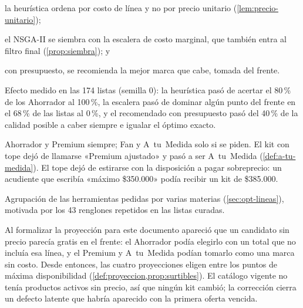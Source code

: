 \begin{evolucion}
\begin{description}[style=nextline,leftmargin=0pt]
        \begin{enumerate*}[label=(\alph*)]
          \item la heurística ordena por costo de línea y no por precio
                unitario (\cref{lem:precio-unitario});
          \item el NSGA-II se siembra con la escalera de costo marginal, que
                también entra al filtro final (\cref{prop:siembra}); y
          \item con presupuesto, se recomienda la mejor marca que cabe,
                tomada del frente.
        \end{enumerate*}
        Efecto medido en las 174 listas (semilla 0): la heurística pasó de
        acertar el 80\,\% de los Ahorrador al 100\,\%, la escalera pasó de
        dominar algún punto del frente en el 68\,\% de las listas al 0\,\%, y
        el recomendado con presupuesto pasó del 40\,\% de la calidad posible a
        caber siempre e igualar el óptimo exacto.
  \item[v5 — Kits a pedido.] Ahorrador y Premium siempre; Fan y A~tu~Medida
        solo si se piden. El kit con tope dejó de llamarse «Premium ajustado» y
        pasó a ser A~tu~Medida (\cref{def:a-tu-medida}). El tope dejó de
        estirarse con la disposición a pagar sobreprecio: un acudiente que
        escribía «máximo \$350.000» podía recibir un kit de \$385.000.
  \item[v6 — Herramientas por hijo.] Agrupación de las herramientas pedidas
        por varias materias (\cref{sec:opt-lineas}), motivada por los 43
        renglones repetidos en las listas curadas.
  \item[v7 — Proyección sobre lo surtible.] Al formalizar la proyección para
        este documento apareció que un candidato sin precio parecía gratis en
        el frente: el Ahorrador podía elegirlo con un total que no incluía esa
        línea, y el Premium y A~tu~Medida podían tomarlo como una marca sin
        costo. Desde entonces, las cuatro proyecciones eligen entre los puntos
        de máxima disponibilidad (\cref{def:proyeccion,prop:surtibles}). El
        catálogo vigente no tenía productos activos sin precio, así que ningún
        kit cambió; la corrección cierra un defecto latente que habría
        aparecido con la primera oferta vencida.
\end{description}
\end{evolucion}
